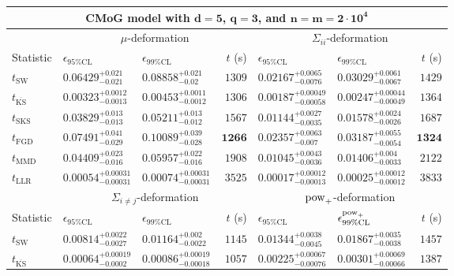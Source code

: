 \begin{tabular}{l|llr|llr}
	\toprule
	\multicolumn{7}{c}{{\bf CMoG model with $\mathbf{d=5}$, $\mathbf{q=3}$, and $\mathbf{n=m=2\cdot 10^{4}}$}} \\
	\toprule
	\multicolumn{1}{c}{} & \multicolumn{3}{c}{$\mu$-deformation} & \multicolumn{3}{c}{$\Sigma_{ii}$-deformation} \\
	Statistic & $\epsilon_{95\%\mathrm{CL}}$ & $\epsilon_{99\%\mathrm    {CL}}$ & $t$ (s) & $\epsilon_{95\%\mathrm{CL}}$ & $\epsilon_{99\%\mathrm{CL}}$ & $t$ (s) \\
	\midrule
	$t_{\mathrm{SW}}$ & $0.06429_{-0.021}^{+0.021}$ & $0.08858_{-0.02}^{+0.021}$ & $1309$ & $0.02167_{-0.0076}^{+0.0065}$ & $0.03029_{-0.0067}^{+0.0061}$ & $1429$ \\
	$t_{\overline{\mathrm{KS}}}$ & ${\mathbf{0.00323_{-0.0013}^{+0.0012}}}$ & ${\mathbf{0.00453_{-0.0012}^{+0.0011}}}$ & $1306$ & ${\mathbf{0.00187_{-0.00058}^{+0.00049}}}$ & ${\mathbf{0.00247_{-0.00049}^{+0.00044}}}$ & $1364$ \\
	$t_{\mathrm{SKS}}$ & $0.03829_{-0.013}^{+0.013}$ & $0.05211_{-0.012}^{+0.013}$ & $1567$ & $0.01144_{-0.0035}^{+0.0027}$ & $0.01578_{-0.0026}^{+0.0024}$ & $1687$ \\
	$t_{\mathrm{FGD}}$ & $0.07491_{-0.029}^{+0.041}$ & $0.10089_{-0.028}^{+0.039}$ & ${\mathbf{1266}}$ & $0.02357_{-0.007}^{+0.0063}$ & $0.03187_{-0.0054}^{+0.0055}$ & ${\mathbf{1324}}$ \\
	$t_{\mathrm{MMD}}$ & $0.04409_{-0.016}^{+0.023}$ & $0.05957_{-0.016}^{+0.022}$ & $1908$ & $0.01045_{-0.0036}^{+0.0043}$ & $0.01406_{-0.0033}^{+0.004}$ & $2122$ \\
	$t_{\mathrm{LLR}}$ & $0.00054_{-0.00031}^{+0.00031}$ & $0.00074_{-0.00031}^{+0.00031}$ & $3525$ & $0.00017_{-0.00013}^{+0.00012}$ & $0.00025_{-0.00012}^{+0.00012}$ & $3833$ \\
	\toprule
	\multicolumn{1}{c}{} & \multicolumn{3}{c}{$\Sigma_{i\neq j}$-deformation} & \multicolumn{3}{c}{$\rm{pow}_{+}$-deformation} \\
	Statistic & $\epsilon_{95\%\mathrm{CL}}$ & $\epsilon_{99\%\mathrm{CL}}$ & $t$ (s) & $\epsilon_{95\%\mathrm{CL}}$ & $\epsilon^{\rm   {pow}_{+}}_{99\%\mathrm{CL}}$ & $t$ (s) \\
	\midrule
	$t_{\mathrm{SW}}$ & $0.00814_{-0.0027}^{+0.0022}$ & $0.01164_{-0.0022}^{+0.002}$ & $1145$ & $0.01344_{-0.0045}^{+0.0038}$ & $0.01867_{-0.0038}^{+0.0035}$ & $1457$ \\
	$t_{\overline{\mathrm{KS}}}$ & ${\mathbf{0.00064_{-0.0002}^{+0.00019}}}$ & ${\mathbf{0.00086_{-0.00018}^{+0.00019}}}$ & $1057$ & ${\mathbf{0.00225_{-0.00076}^{+0.00067}}}$ & ${\mathbf{0.00301_{-0.00066}^{+0.00069}}}$ & $1387$ \\

\end{tabular}
